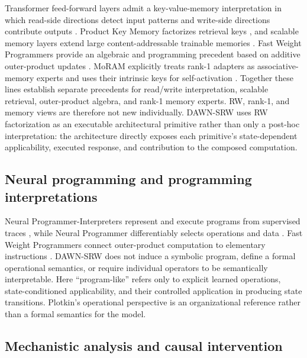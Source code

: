 \documentclass{article}
\newcommand{\DAWN}{DAWN-SRW}
\begin{document}
Transformer feed-forward layers admit a key-value-memory interpretation in
which read-side directions detect input patterns and write-side directions
contribute outputs \cite{geva2021transformer}. Product Key Memory factorizes
retrieval keys \cite{lample2019large}, and scalable memory layers extend large
content-addressable trainable memories \cite{berges2024memory}. Fast Weight
Programmers provide an algebraic and programming precedent based on additive
outer-product updates \cite{schlag2021linear}. MoRAM explicitly treats rank-1
adapters as associative-memory experts and uses their intrinsic keys for
self-activation \cite{lu2026little}. Together these lines establish separate
precedents for read/write interpretation, scalable retrieval, outer-product
algebra, and rank-1 memory experts. RW, rank-1, and memory views are therefore
not new individually. \DAWN{} uses RW factorization as an executable
architectural primitive rather than only a post-hoc interpretation: the
architecture directly exposes each primitive's state-dependent applicability,
executed response, and contribution to the composed computation.

\subsection{Neural programming and programming interpretations}

Neural Programmer-Interpreters represent and execute programs from supervised
traces \cite{reed2016npi}, while Neural Programmer differentiably selects
operations and data \cite{neelakantan2016neuralprogrammer}. Fast Weight
Programmers connect outer-product computation to elementary instructions
\cite{schlag2021linear}. \DAWN{} does not induce a symbolic program, define a
formal operational semantics, or require individual operators to be
semantically interpretable. Here ``program-like'' refers only to explicit
learned operations, state-conditioned applicability, and their controlled
application in producing state transitions. Plotkin's operational perspective
is an organizational reference rather than a formal semantics for the model.

\subsection{Mechanistic analysis and causal intervention}
\end{document}
